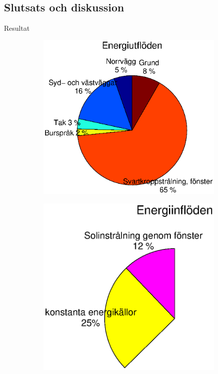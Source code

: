 \subsection{Slutsats och diskussion}

\begin{frame}{Resultat}


\begin{figure}
        \begin{subfigure}[b]{0.55\textwidth}
                \centering
                \includegraphics[width=\textwidth]{images/totalflow_out.eps}
        \end{subfigure}
        \hskip-1.5cm
        \begin{subfigure}[b]{0.55\textwidth}
                \centering
                \includegraphics[width=\textwidth]{images/totalflow_in.eps}
        \end{subfigure}
\end{figure}

\end{frame}
